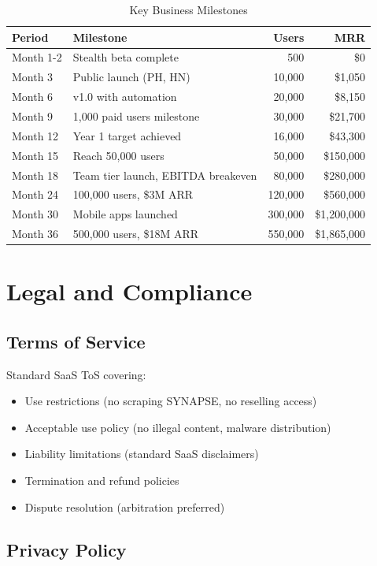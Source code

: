 \documentclass{report}
\begin{document}
\begin{table}[h]
\centering
\begin{tabular}{|l|l|r|r|}
\toprule
\textbf{Period} & \textbf{Milestone} & \textbf{Users} & \textbf{MRR} \\
\midrule
Month 1-2 & Stealth beta complete & 500 & \$0 \\
Month 3 & Public launch (PH, HN) & 10,000 & \$1,050 \\
Month 6 & v1.0 with automation & 20,000 & \$8,150 \\
Month 9 & 1,000 paid users milestone & 30,000 & \$21,700 \\
Month 12 & Year 1 target achieved & 16,000 & \$43,300 \\
\midrule
Month 15 & Reach 50,000 users & 50,000 & \$150,000 \\
Month 18 & Team tier launch, EBITDA breakeven & 80,000 & \$280,000 \\
Month 24 & 100,000 users, \$3M ARR & 120,000 & \$560,000 \\
\midrule
Month 30 & Mobile apps launched & 300,000 & \$1,200,000 \\
Month 36 & 500,000 users, \$18M ARR & 550,000 & \$1,865,000 \\
\bottomrule
\end{tabular}
\caption{Key Business Milestones}
\end{table}

\section{Legal and Compliance}

\subsection{Terms of Service}

Standard SaaS ToS covering:
\begin{itemize}
    \item Use restrictions (no scraping SYNAPSE, no reselling access)
    \item Acceptable use policy (no illegal content, malware distribution)
    \item Liability limitations (standard SaaS disclaimers)
    \item Termination and refund policies
    \item Dispute resolution (arbitration preferred)
\end{itemize}

\subsection{Privacy Policy}
\end{document}

